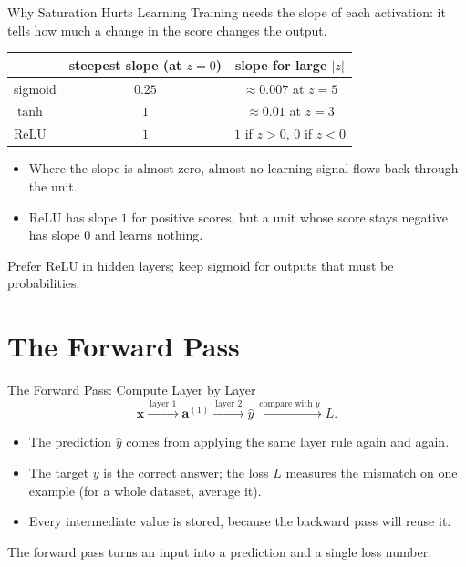 \documentclass{ntuabeamer}
\begin{document}
\begin{frame}{Why Saturation Hurts Learning}
  Training needs the slope of each activation: it tells how much a change in the score changes the output.
  \begin{center}
    \begin{tabular}{lcc}
      \toprule
      & steepest slope (at $z=0$) & slope for large $|z|$\\
      \midrule
      sigmoid & $0.25$ & $\approx 0.007$ at $z=5$\\
      $\tanh$ & $1$ & $\approx 0.01$ at $z=3$\\
      ReLU & $1$ & $1$ if $z>0$, $0$ if $z<0$\\
      \bottomrule
    \end{tabular}
  \end{center}
  \begin{itemize}
    \item Where the slope is almost zero, almost no learning signal flows back through the unit.
    \item ReLU has slope $1$ for positive scores, but a unit whose score stays negative has slope $0$ and learns nothing.
  \end{itemize}
  Prefer ReLU in hidden layers; keep sigmoid for outputs that must be probabilities.
\end{frame}


\section{The Forward Pass}

\begin{frame}{The Forward Pass: Compute Layer by Layer}
  \[
    \mathbf x
    \xrightarrow{\ \text{layer 1}\ }
    \mathbf a^{(1)}
    \xrightarrow{\ \text{layer 2}\ }
    \hat y
    \xrightarrow{\ \text{compare with }y\ }
    L .
  \]
  \begin{itemize}
    \item The prediction $\hat y$ comes from applying the same layer rule again and again.
    \item The target $y$ is the correct answer; the loss $L$ measures the mismatch on one example (for a whole dataset, average it).
    \item Every intermediate value is stored, because the backward pass will reuse it.
  \end{itemize}
  The forward pass turns an input into a prediction and a single loss number.
\end{frame}
\end{document}
